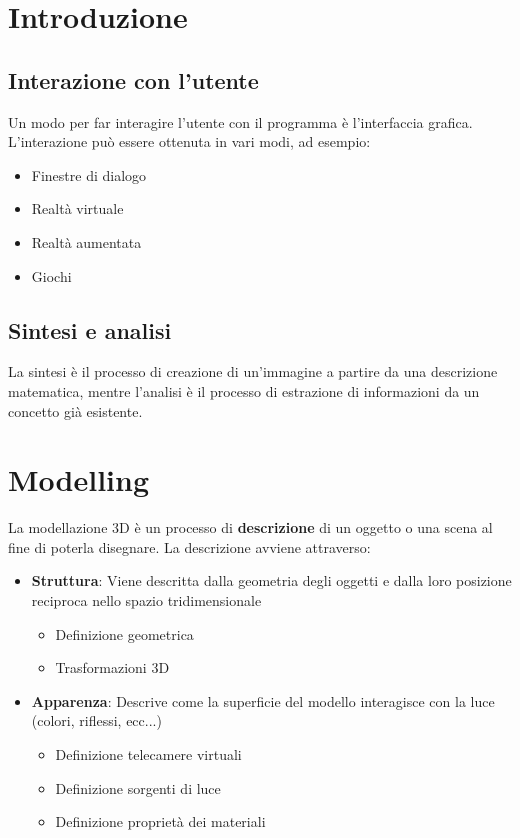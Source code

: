 \documentclass[a4paper]{article}
\begin{document}


\tableofcontents
\pagebreak

\section{Introduzione}

\subsection{Interazione con l'utente}
Un modo per far interagire l'utente con il programma è l'interfaccia grafica. L'interazione
può essere ottenuta in vari modi, ad esempio:
\begin{itemize}
    \item Finestre di dialogo
    \item Realtà virtuale
    \item Realtà aumentata
    \item Giochi
\end{itemize}

\subsection{Sintesi e analisi}
La sintesi è il processo di creazione di un'immagine a partire da una descrizione matematica,
mentre l'analisi è il processo di estrazione di informazioni da un concetto già esistente.

\section{Modelling}
La modellazione 3D è un processo di \textbf{descrizione} di un oggetto o una scena al fine
di poterla disegnare. La descrizione avviene attraverso:
\begin{itemize}
  \item \textbf{Struttura}: Viene descritta dalla geometria degli oggetti e dalla loro
    posizione reciproca nello spazio tridimensionale
    \begin{itemize}
      \item Definizione geometrica
      \item Trasformazioni 3D
    \end{itemize}

  \item \textbf{Apparenza}: Descrive come la superficie del modello interagisce con
    la luce (colori, riflessi, ecc...)
    \begin{itemize}
      \item Definizione telecamere virtuali
      \item Definizione sorgenti di luce
      \item Definizione proprietà dei materiali
    \end{itemize}
\end{itemize}
\end{document}
